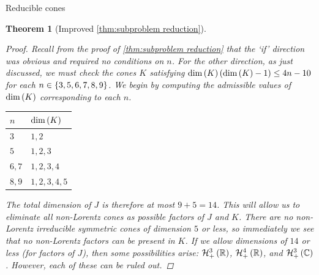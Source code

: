 \documentclass{interact}
\theoremstyle{plain}
\newtheorem{theorem}{Theorem}[section]
\theoremstyle{definition}
\theoremstyle{remark}
\begin{document}
\begin{section}{Reducible cones}
\begin{theorem}[Improved \cref{thm:subproblem reduction}]
      \begin{proof}
        Recall from the proof of \cref{thm:subproblem reduction} that
        the `if' direction was obvious and required no conditions on
        $n$. For the other direction, as just discussed, we must check
        the cones $K$ satisfying $\dim\left({K}\right)\left({\dim\left({K}\right) - 1}\right) \le
        4n - 10$ for each $n \in \left\lbrace{3,5,6,7,8,9}\right\rbrace$. We begin by
        computing the admissible values of $\dim\left({K}\right)$ corresponding
        to each $n$.
        \begin{table}[H]
          \begin{center}
            \begin{tabular}{l l}
              $n$ & $\dim\left({K}\right)$\\
              \midrule
              $3$ & $1,2$\\
              $5$ & $1,2,3$\\
              $6,7$ & $1,2,3,4$\\
              $8,9$ & $1,2,3,4,5$
            \end{tabular}
          \end{center}
        \end{table}
        The total dimension of $J$ is therefore at most $9 + 5 =
        14$. This will allow us to eliminate all non-Lorentz cones as
        possible factors of $J$ and $K$. There are no non-Lorentz
        irreducible symmetric cones of dimension $5$ or less, so
        immediately we see that no non-Lorentz factors can be present
        in $K$. If we allow dimensions of $14$ or less (for factors of
        $J$), then some possibilities arise: $\Hnplus[3]\of{\Rn[1]}$,
        $\Hnplus[4]\of{\Rn[1]}$, and $\Hnplus[3]\of{\Cn[1]}$. However,
        each of these can be ruled out.


\end{proof}
\end{theorem}
\end{section}
\end{document}
